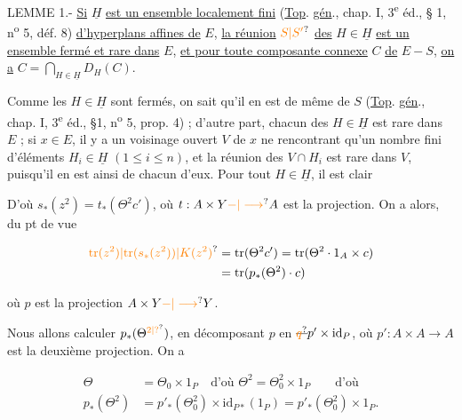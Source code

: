 LEMME 1.- \uline{Si} $\underline H$ \uline{est un ensemble localement fini} (\uline{Top}. \uline{gén}., chap. I, 3\textsuperscript{e} éd., § 1, n\textsuperscript{o} 5, déf. 8) \uline{d'hyperplans affines de} $E$, \uline{la réunion} $\unsure{S|S'}$ \uline{des} $H\in\underline H$ \uline{est un ensemble fermé et rare dans} $E$, \uline{et pour toute composante connexe} $C$ \uline{de} $E-S$, \uline{on a} $C=\bigcap\limits_{H\in\underline H}D_H(C)$.

Comme les $H\in\underline H$ sont fermés, on sait qu'il en est de même de $S$ (\uline{Top}. \uline{gén}., chap. I, 3\textsuperscript{e} éd., §1, n\textsuperscript{o} 5, prop. 4) ; d'autre part, chacun des $H\in\underline H$ est rare dans $E$ ; si $x\in E$, il y a un voisinage ouvert $V$ de $x$ ne rencontrant qu'un nombre fini d'éléments $H_i\in\underline H$ $(1\leq i\leq n)$, et la réunion des $V\cap H_i$ est rare dans $V$, puisqu'il en est ainsi de chacun d'eux. Pour tout $H\in\underline H$, il est clair

D'où $s_*(z^2)=t_*(\Theta^2c')$, où $t:A\times Y\unsure{-|\longrightarrow}A$ est la projection. On a alors, du pt de vue 


\[
\begin{aligned}
\unsure{\mathrm{tr}(z^2)|\mathrm{tr}(s_*(z^2))|K(z^2)}&=\mathrm{tr}(\Theta^2c')=\mathrm{tr}(\Theta^2\cdot1_A\times c)\\
&=\mathrm{tr}(p_*(\Theta^2)\cdot c)
\end{aligned}
\]

où $p$ est la projection $A\times Y\unsure{-|\longrightarrow}Y$.

Nous allons calculer $p_*(\Theta^{\unsure{2|?}})$, en décomposant $p$ en $\deleted{\unsure{q}}p'\times\mathrm{id}_{P}$, où $p':A\times A\longrightarrow A$ est la deuxième projection. On a


\[
\begin{aligned}
\Theta&=\Theta_0\times1_P\quad\text{d'où }\Theta^2=\Theta_0^2\times1_P\qquad\text{d'où}\\
p_*(\Theta^2)&=p'_*(\Theta_0^2)\times\mathrm{id}_{P*}(1_P)=p'_*(\Theta_0^2)\times1_P.
\end{aligned}
\]

